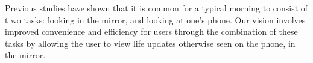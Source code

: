 Previous studies have shown that it is common for a typical morning to consist of t	wo tasks: looking in the mirror, and looking at one's phone. Our vision involves improved convenience and efficiency for users through the combination of these tasks by allowing the user to view life updates otherwise seen on the phone, in the mirror.